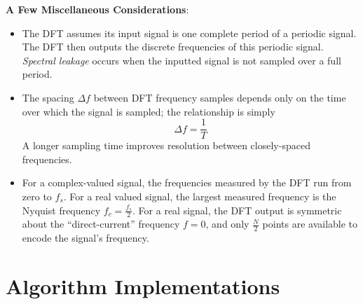 \documentclass[11pt, a4paper]{article}
\begin{document}
\vspace{2mm}
\textbf{A Few Miscellaneous Considerations}:
\begin{itemize}

	\item The DFT assumes its input signal is one complete period of a periodic signal. The DFT then outputs the discrete frequencies of this periodic signal. \textit{Spectral leakage} occurs when the inputted signal is not sampled over a full period.
	
	\item The spacing $ \Delta f $ between DFT frequency samples  depends only on the time over which the signal is sampled; the relationship is simply
	\begin{equation*}
		\Delta f = \frac{1}{T}
	\end{equation*}
	A longer sampling time improves resolution between closely-spaced frequencies.
	
	\item For a complex-valued signal, the frequencies measured by the DFT run from zero to $ f_{s} $. For a real valued signal, the largest measured frequency is the Nyquist frequency $ f_{c} = \frac{f_{s}}{2} $. For a real signal, the DFT output is symmetric about the ``direct-current'' frequency $ f = 0 $, and only $ \frac{N}{2} $ points are available to encode the signal's frequency. 
	
	\iffalse
	\item Zero padding merely interpolates the coarse spectrum to become more smooth---more frequency bins. It does not add more information to the spectrum than the coarse spectrum already contains. It just helps reveal what is in the coarse spectrum. 
	
	Zero padding cannot be used to resolve multiple peaks from a single peak. But if you already see two peaks, it can give a better sense of their exact values, in case they might be off from their true value because of a...low sample rate or short sample period?
	\fi

	
\end{itemize}


\section{Algorithm Implementations}  \label{dft:s:solution}
\end{document}
